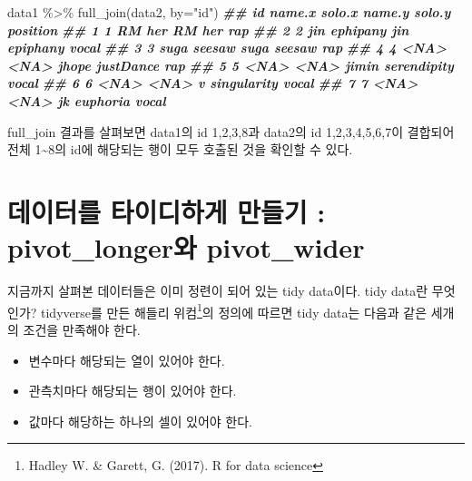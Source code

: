 \documentclass[
]{book}
\newenvironment{Shaded}{\begin{snugshade}}{\end{snugshade}}
\newcommand{\AttributeTok}[1]{\textcolor[rgb]{0.77,0.63,0.00}{#1}}
\newcommand{\DocumentationTok}[1]{\textcolor[rgb]{0.56,0.35,0.01}{\textbf{\textit{#1}}}}
\newcommand{\FunctionTok}[1]{\textcolor[rgb]{0.00,0.00,0.00}{#1}}
\newcommand{\NormalTok}[1]{#1}
\newcommand{\SpecialCharTok}[1]{\textcolor[rgb]{0.00,0.00,0.00}{#1}}
\newcommand{\StringTok}[1]{\textcolor[rgb]{0.31,0.60,0.02}{#1}}
\providecommand{\tightlist}{%
  \setlength{\itemsep}{0pt}\setlength{\parskip}{0pt}}
\theoremstyle{definition}
\theoremstyle{definition}
\theoremstyle{definition}
\theoremstyle{definition}
\theoremstyle{remark}
\begin{document}
\begin{Shaded}
\begin{Highlighting}[]
\NormalTok{data1 }\SpecialCharTok{\%\textgreater{}\%} 
  \FunctionTok{full\_join}\NormalTok{(data2, }\AttributeTok{by=}\StringTok{"id"}\NormalTok{)}
\DocumentationTok{\#\#   id name.x   solo.x name.y      solo.y position}
\DocumentationTok{\#\# 1  1     RM      her     RM         her      rap}
\DocumentationTok{\#\# 2  2    jin ephipany    jin    epiphany    vocal}
\DocumentationTok{\#\# 3  3   suga   seesaw   suga      seesaw      rap}
\DocumentationTok{\#\# 4  4   \textless{}NA\textgreater{}     \textless{}NA\textgreater{}  jhope   justDance      rap}
\DocumentationTok{\#\# 5  5   \textless{}NA\textgreater{}     \textless{}NA\textgreater{}  jimin serendipity    vocal}
\DocumentationTok{\#\# 6  6   \textless{}NA\textgreater{}     \textless{}NA\textgreater{}      v singularity    vocal}
\DocumentationTok{\#\# 7  7   \textless{}NA\textgreater{}     \textless{}NA\textgreater{}     jk    euphoria    vocal}
\end{Highlighting}
\end{Shaded}

full\_join 결과를 살펴보면 data1의 id 1,2,3,8과 data2의 id 1,2,3,4,5,6,7이 결합되어 전체 1\textasciitilde8의 id에 해당되는 행이 모두 호출된 것을 확인할 수 있다.

\hypertarget{uxb370uxc774uxd130uxb97c-uxd0c0uxc774uxb514uxd558uxac8c-uxb9ccuxb4e4uxae30-pivot_longeruxc640-pivot_wider}{%
\section{데이터를 타이디하게 만들기 : pivot\_longer와 pivot\_wider}\label{uxb370uxc774uxd130uxb97c-uxd0c0uxc774uxb514uxd558uxac8c-uxb9ccuxb4e4uxae30-pivot_longeruxc640-pivot_wider}}

지금까지 살펴본 데이터들은 이미 정련이 되어 있는 tidy data이다. tidy data란 무엇인가? tidyverse를 만든 해들리 위컴\footnote{Hadley W. \& Garett, G. (2017). R for data science}의 정의에 따르면 tidy data는 다음과 같은 세개의 조건을 만족해야 한다.

\begin{itemize}
\tightlist
\item
  변수마다 해당되는 열이 있어야 한다.
\item
  관측치마다 해당되는 행이 있어야 한다.
\item
  값마다 해당하는 하나의 셀이 있어야 한다.
\end{itemize}
\end{document}
